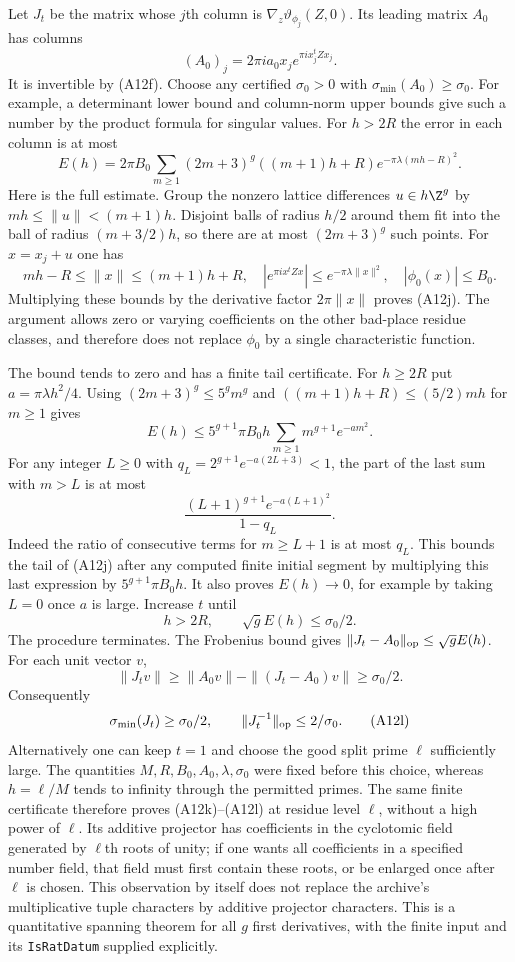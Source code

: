 \documentclass[11pt]{article}
\theoremstyle{definition}\newtheorem{definition}[theorem]{Definition}\newtheorem{remark}[theorem]{Remark}
\begin{document}
Let $J_t$ be the matrix whose $j$th column is
$\nabla_z\vartheta_{\phi_j}(Z,0)$.  Its leading matrix
$A_0$ has columns
\[
         (A_0)_j=2\pi i a_0x_j e^{\pi i x_j^tZx_j}.
 \tag{A12i}
\]
It is invertible by (A12f).  Choose any certified
$\sigma_0>0$ with $\sigma_{\min}(A_0)\geq\sigma_0$.
For example, a determinant lower bound and column-norm
upper bounds give such a number by the product formula
for singular values.  For $h>2R$ the error in each column
is at most
\[
 E(h)=2\pi B_0\sum_{m\geq1}(2m+3)^g
        ((m+1)h+R)e^{-\pi\lambda(mh-R)^2}.
 \tag{A12j}
\]
Here is the full estimate.  Group the nonzero lattice
differences $u\in h\Z^g$ by
$mh\leq\|u\|<(m+1)h$.  Disjoint balls of radius
$h/2$ around them fit into the ball of radius
$(m+3/2)h$, so there are at most $(2m+3)^g$ such
points.  For $x=x_j+u$ one has
\[
 mh-R\leq\|x\|\leq(m+1)h+R,
 \quad |e^{\pi ix^tZx}|\leq e^{-\pi\lambda\|x\|^2},
 \quad |\phi_0(x)|\leq B_0.
\]
Multiplying these bounds by the derivative factor
$2\pi\|x\|$ proves (A12j).  The argument allows zero
or varying coefficients on the other bad-place residue
classes, and therefore does not replace $\phi_0$ by
a single characteristic function.

The bound tends to zero and has a finite tail certificate.
For $h\geq2R$ put $a=\pi\lambda h^2/4$.  Using
$(2m+3)^g\leq5^gm^g$ and
$((m+1)h+R)\leq(5/2)mh$ for $m\geq1$ gives
\[
 E(h)\leq5^{g+1}\pi B_0h
                   \sum_{m\geq1}m^{g+1}e^{-am^2}.
\]
For any integer $L\geq0$ with
$q_L=2^{g+1}e^{-a(2L+3)}<1$, the part of the last
sum with $m>L$ is at most
\[
          \frac{(L+1)^{g+1}e^{-a(L+1)^2}}{1-q_L}.
\]
Indeed the ratio of consecutive terms for $m\geq L+1$
is at most $q_L$.  This bounds the tail of (A12j)
after any computed finite initial segment by multiplying
this last expression by $5^{g+1}\pi B_0h$.
It also proves $E(h)\longrightarrow0$, for example by
taking $L=0$ once $a$ is large.  Increase $t$ until
\[
                  h>2R,\qquad
                  \sqrt g E(h)\leq\sigma_0/2.
 \tag{A12k}
\]
The procedure terminates.  The Frobenius bound gives
$\|J_t-A_0\|_{\rm op}\leq\sqrt g E(h)$.
For each unit vector $v$,
\[
 \|J_tv\|\geq\|A_0v\|-\|(J_t-A_0)v\|
                       \geq\sigma_0/2.
\]
Consequently
\[
       \sigma_{\min}(J_t)\geq\sigma_0/2,
                   \qquad \|J_t^{-1}\|_{\rm op}\leq2/\sigma_0.
 \tag{A12l}
\]
Alternatively one can keep $t=1$ and choose the good
split prime $\ell$ sufficiently large.  The quantities
$M,R,B_0,A_0,\lambda,\sigma_0$ were fixed before this
choice, whereas $h=\ell/M$ tends to infinity through
the permitted primes.  The same finite certificate
therefore proves (A12k)--(A12l) at residue level
$\ell$, without a high power of $\ell$.  Its additive
projector has coefficients in the cyclotomic field
generated by $\ell$th roots of unity; if one wants
all coefficients in a specified number field, that
field must first contain these roots, or be enlarged
once after $\ell$ is chosen.  This observation by
itself does not replace the archive's multiplicative
tuple characters by additive projector characters.
This is a quantitative spanning theorem for all $g$
first derivatives, with the finite input and its
\texttt{IsRatDatum} supplied explicitly.
\end{document}
